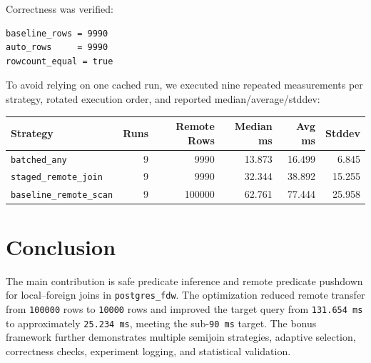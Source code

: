 \documentclass[10pt,a4paper]{article}
\begin{document}
Correctness was verified:

\begin{lstlisting}[style=sqlstyle]
baseline_rows = 9990
auto_rows     = 9990
rowcount_equal = true
\end{lstlisting}

To avoid relying on one cached run, we executed nine repeated measurements per strategy, rotated execution order, and reported median/average/stddev:

\begin{table}[h]
\centering
\small
\begin{tabular}{lrrrrr}
\toprule
\textbf{Strategy} & \textbf{Runs} & \textbf{Remote Rows} & \textbf{Median ms} & \textbf{Avg ms} & \textbf{Stddev} \\
\midrule
\texttt{batched\_any} & 9 & 9990 & 13.873 & 16.499 & 6.845 \\
\texttt{staged\_remote\_join} & 9 & 9990 & 32.344 & 38.892 & 15.255 \\
\texttt{baseline\_remote\_scan} & 9 & 100000 & 62.761 & 77.444 & 25.958 \\
\bottomrule
\end{tabular}
\end{table}

\section{Conclusion}

The main contribution is safe predicate inference and remote predicate pushdown for local--foreign joins in \texttt{postgres\_fdw}. The optimization reduced remote transfer from \texttt{100000} rows to \texttt{10000} rows and improved the target query from \texttt{131.654 ms} to approximately \texttt{25.234 ms}, meeting the sub-\texttt{90 ms} target. The bonus framework further demonstrates multiple semijoin strategies, adaptive selection, correctness checks, experiment logging, and statistical validation.
\end{document}
